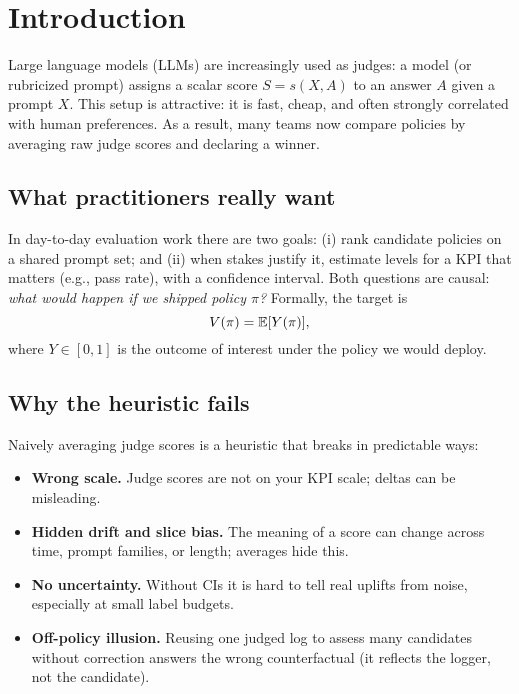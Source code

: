 \section{Introduction}

Large language models (LLMs) are increasingly used as judges: a model (or rubricized prompt) assigns a scalar score $S = s(X, A)$ to an answer $A$ given a prompt $X$. This setup is attractive: it is fast, cheap, and often strongly correlated with human preferences. As a result, many teams now compare policies by averaging raw judge scores and declaring a winner.

\subsection{What practitioners really want}

In day-to-day evaluation work there are two goals: (i) rank candidate policies on a shared prompt set; and (ii) when stakes justify it, estimate levels for a KPI that matters (e.g., pass rate), with a confidence interval. Both questions are causal: \emph{what would happen if we shipped policy $\pi$?} Formally, the target is
\begin{equation}
V(\pi) = \operatorname{\mathbb{E}}[Y(\pi)],
\end{equation}
where $Y \in [0, 1]$ is the outcome of interest under the policy we would deploy.

\subsection{Why the heuristic fails}

Naively averaging judge scores is a heuristic that breaks in predictable ways:

\begin{itemize}
\item \textbf{Wrong scale.} Judge scores are not on your KPI scale; deltas can be misleading.
\item \textbf{Hidden drift and slice bias.} The meaning of a score can change across time, prompt families, or length; averages hide this.
\item \textbf{No uncertainty.} Without CIs it is hard to tell real uplifts from noise, especially at small label budgets.
\item \textbf{Off-policy illusion.} Reusing one judged log to assess many candidates without correction answers the wrong counterfactual (it reflects the logger, not the candidate).
\end{itemize}

